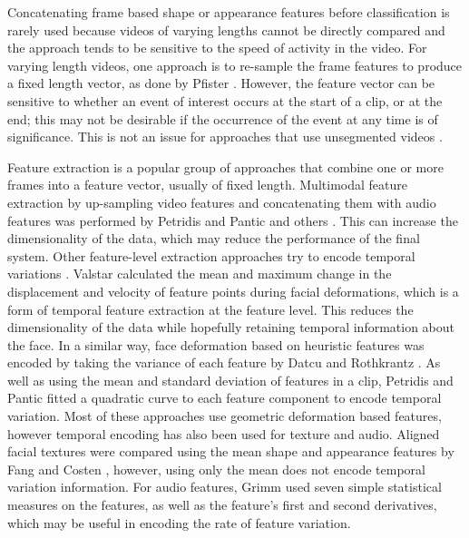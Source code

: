 Concatenating frame based shape or appearance features before classification is rarely used because videos of varying lengths cannot be directly compared and the approach tends to be sensitive to the speed of activity in the video. For varying length videos, one approach is to re-sample the frame features to produce a fixed length vector, as done by Pfister \etal \cite{Pfister2011}. However, the feature vector can be sensitive to whether an event of interest occurs at the start of a clip, or at the end; this may not be desirable if the occurrence of the event at any time is of significance. This is not an issue for approaches that use unsegmented videos \cite{Oikonomopoulos2011}.

Feature extraction is a popular group of approaches that combine one or more frames into a feature vector, usually of fixed length. Multimodal feature extraction by up-sampling video features and concatenating them with audio features was performed by Petridis and Pantic \cite{Petridis2008, Petridis2009, Petridis2011} and others \cite{Potamianos2001, McCowan2005, Nicolaou2011b}. This can increase the dimensionality of the data, which may reduce the performance of the final system. Other feature-level extraction approaches try to encode temporal variations \cite{Dietrich2001}. Valstar \etal \cite{Valstar2006} calculated the mean and maximum change in the displacement and velocity of feature points during facial deformations, which is a form of temporal feature extraction at the feature level. This reduces the dimensionality of the data while hopefully retaining temporal information about the face. In a similar way, face deformation based on heuristic features was encoded by taking the variance of each feature by Datcu and Rothkrantz \cite{Datcu2007}. As well as using the mean and standard deviation of features in a clip, Petridis and Pantic \cite{Petridis2008} fitted a quadratic curve to each feature component to encode temporal variation. Most of these approaches use geometric deformation based features, however temporal encoding has also been used for texture and audio. Aligned facial textures were compared using the mean shape and appearance features by Fang and Costen \cite{Fang2009}, however, using only the mean does not encode temporal variation information. For audio features, Grimm \etal \cite{Grimm2007} used seven simple statistical measures on the features, as well as the feature's first and second derivatives, which may be useful in encoding the rate of feature variation.

